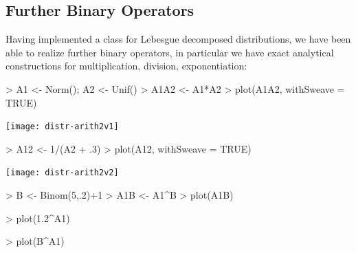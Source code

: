\documentclass[11pt]{article}
\begin{document}
\subsection{Further Binary Operators}
%
Having implemented a class for Lebesgue decomposed distributions, we have been
able to realize further binary operators, in particular we have exact
analytical constructions for multiplication, division, exponentiation:
\begin{Schunk}
\begin{Sinput}
>   A1 <- Norm(); A2 <- Unif()
>   A1A2 <- A1*A2
>   plot(A1A2, withSweave = TRUE)
\end{Sinput}
\end{Schunk}
\texttt{[image: distr-arith2v1]}
\begin{Schunk}
\begin{Sinput}
>   A12 <- 1/(A2 + .3)
>   plot(A12, withSweave = TRUE)
\end{Sinput}
\end{Schunk}
\texttt{[image: distr-arith2v2]}
\begin{Schunk}
\begin{Sinput}
>   B <- Binom(5,.2)+1
>   A1B <- A1^B
>   plot(A1B)
\end{Sinput}
\end{Schunk}
\begin{Schunk}
\begin{Sinput}
>   plot(1.2^A1)
\end{Sinput}
\end{Schunk}
\begin{Schunk}
\begin{Sinput}
>   plot(B^A1)
\end{Sinput}
\end{Schunk}
%
\end{document}
